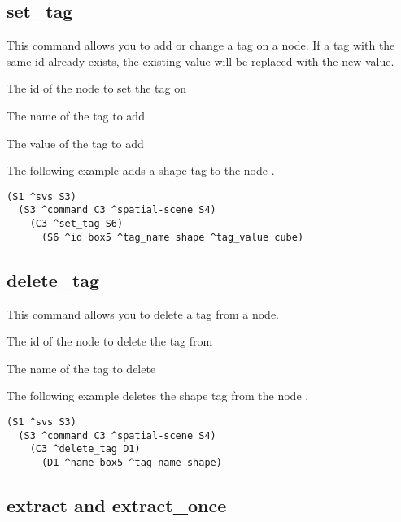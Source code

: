 \subsection{set\_tag}

This command allows you to add or change a tag on a node.
If a tag with the same id already exists,
the existing value will be replaced with the new value.

\begin{description}
	\item{} The id of the node to set the tag on
	\item{} The name of the tag to add
	\item{} The value of the tag to add
\end{description}

The following example adds a shape tag to the node .

\begin{verbatim}
(S1 ^svs S3)
  (S3 ^command C3 ^spatial-scene S4)
    (C3 ^set_tag S6)
      (S6 ^id box5 ^tag_name shape ^tag_value cube)
\end{verbatim}


\subsection{delete\_tag}

This command allows you to delete a tag from a node.

\begin{description}
	\item{} The id of the node to delete the tag from
	\item{} The name of the tag to delete
\end{description}

The following example deletes the shape tag from the node .

\begin{verbatim}
(S1 ^svs S3)
  (S3 ^command C3 ^spatial-scene S4)
    (C3 ^delete_tag D1)
      (D1 ^name box5 ^tag_name shape)
\end{verbatim}


\subsection{extract and extract\_once}

